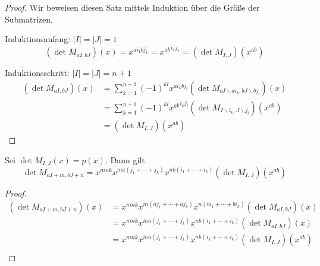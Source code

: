 \begin{proof}
    Wir beweisen diesen Satz mittels Induktion über die Größe der Submatrizen. 

    Induktionsanfang: $|I| = |J| = 1$
    \begin{equation*}
        \left( \det{} M_{aI,bJ} \right) (x) = x^{ai_1bj_1} = {x^{ab}}^{i_1j_1} = \left( \det{} M_{I,J} \right) (x^{ab})
    \end{equation*}

    Induktionsschritt: $|I| = |J| = n+1$
    \begin{align*}
        \left( \det{} M_{aI,bJ} \right) (x) &= \sum_{k=1}^{n+1} (-1)^{kl} x^{ai_kbj_l} \left( \det M_{aI\backslash ai_k, bJ \backslash bj_l} \right) (x) \\
                                            &= \sum_{k=1}^{n+1} (-1)^{kl} {x^{ab}}^{i_kj_l} \left( \det M_{I\backslash i_k, J \backslash j_l} \right) (x^{ab}) \\
                                            &= \left( \det{} M_{I,J} \right) (x^{ab})
    \end{align*}
\end{proof}

\begin{korollar}
    Sei $\det{} M_{I,J}(x) = p(x)$. Dann gilt
    \begin{equation*}
        \det{} M_{aI + m,bJ + n} = x^{mnk} x^{ma(j_1 +\cdots + j_k)} x^{nb(i_1+\cdots +i_k)} \left( \det{} M_{I,J} \right) (x^{ab})
    \end{equation*}
\end{korollar}

\begin{proof}
    \begin{align*}
        \left( \det{} M_{aI + m,bJ + n} \right) (x) &= x^{mnk} x^{m(aj_1 +\cdots + aj_k)} x^{n(bi_1+\cdots +bi_k)} \left( \det{} M_{aI,bJ} \right) (x) \\
                                                    &= x^{mnk} x^{ma(j_1 +\cdots + j_k)} x^{nb(i_1+\cdots +i_k)} \left( \det{} M_{aI,bJ} \right) (x) \\
                                                    &= x^{mnk} x^{ma(j_1 +\cdots + j_k)} x^{nb(i_1+\cdots +i_k)} \left( \det{} M_{I,J} \right) (x^{ab}) \\
    \end{align*}
\end{proof}